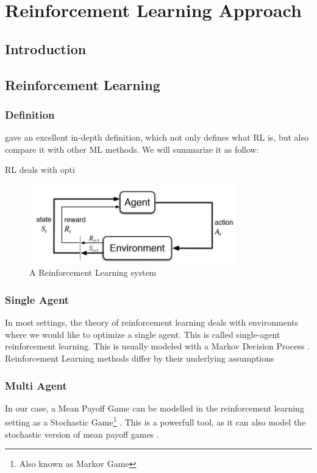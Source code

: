 \chapter{Reinforcement Learning Approach}
\section{Introduction}
\section{Reinforcement Learning}
\subsection{Definition}
\citeauthor{RLIntroduction} \cite[Chapter.~1]{RLIntroduction} gave an excellent in-depth definition, which not only defines what RL is, but also compare it with other ML methods.
\newline We will summarize it as follow:
\begin{definition}
	RL deals with opti
\end{definition}
\begin{figure}
	\centering
	\includegraphics[width= 0.8\textwidth]{Figures/RLDiagram.png}
	\caption{A Reinforcement Learning system}
\end{figure}
\subsection{Single Agent}
In most settings, the theory of reinforcement learning deals with environments where we would like to optimize a single agent. This is called single-agent reinforcement learning. This is usually modeled with a Markov Decision Process \cite[Chapter~3]{RLIntroduction}.
\newline Reinforcement Learning methods differ by their underlying assumptions

\subsection{Multi Agent}
In our case, a Mean Payoff Game can be modelled in the reinforcement learning setting as a Stochastic Game\footnote{Also known as Markov Game} \cite{StochasticGames}.
\newline This is a powerfull tool, as it can also model the stochastic version of mean payoff games \cite{StochasticMPG}. 

